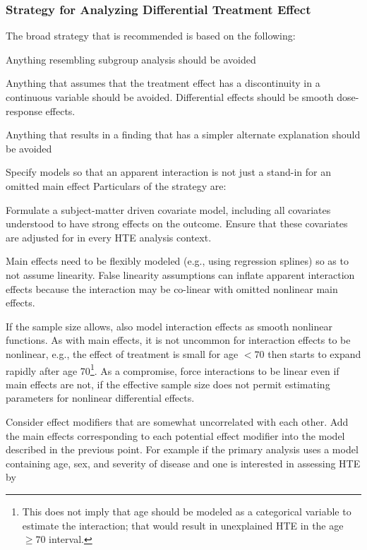 \subsubsection{Strategy for Analyzing Differential Treatment Effect}
The broad strategy that is recommended is based on the following:
\bi
\item Anything resembling subgroup analysis should be avoided
\item Anything that assumes that the treatment effect has a
  discontinuity in a continuous variable should be avoided.
  Differential effects should be smooth dose-response effects.
\item Anything that results in a finding that has a simpler alternate
  explanation should be avoided
  \bi
  \item Specify models so that an apparent interaction is not just a
    stand-in for an omitted main effect
  \ei
\ei
Particulars of the strategy are:
\bi
\item Formulate a subject-matter driven covariate model, including all
  covariates understood to have strong effects on the outcome.  Ensure
  that these covariates are adjusted for in every HTE analysis context.
\item Main effects need to be flexibly modeled (e.g., using regression
  splines) so as to not assume linearity.  False linearity assumptions
  can inflate apparent interaction effects because the interaction may
  be co-linear with omitted nonlinear main effects.
\item If the sample size allows, also model interaction effects as
  smooth nonlinear functions.  As with main effects, it is not
  uncommon for interaction effects to be nonlinear, e.g., the effect
  of treatment is small for age $<70$ then starts to expand rapidly
  after age 70\footnote{This does not imply that age should be modeled
    as a categorical variable to estimate the interaction; that would
    result in unexplained HTE in the age $\geq 70$ interval.}.  As a
  compromise, force interactions to be linear even if main effects are
  not, if the effective sample size does not permit estimating
  parameters for nonlinear differential effects.
\item Consider effect modifiers that are somewhat uncorrelated with
  each other.  Add the main effects corresponding to each potential
  effect modifier into the model described in the previous point.  For
  example if the primary analysis uses a model containing age, sex,
  and severity of disease and one is interested in assessing HTE by
